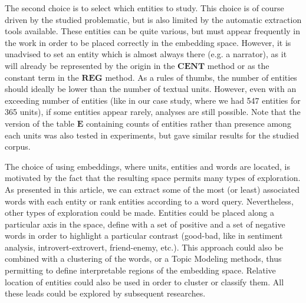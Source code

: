 \documentclass[
twocolumn,
]{ceurart}
\begin{document}
The second choice is to select which entities to study. This choice is of course driven by the studied problematic, but is also limited by the automatic extraction tools available. These entities can be quite various, but must appear frequently in the work in order to be placed correctly in the embedding space. However, it is unadvised to set an entity which is almost always there (e.g. a narrator), as it will already be represented by the origin in the $\mathbf{CENT}$ method or as the constant term in the $\mathbf{REG}$ method. As a rules of thumbs, the number of entities should ideally be lower than the number of textual units. However, even with an exceeding number of entities (like in our case study, where we had 547 entities for 365 units), if some entities appear rarely, analyses are still possible. Note that the version of the table $\mathbf{E}$ containing counts of entities rather than presence among each units was also tested in experiments, but gave similar results for the studied corpus.

The choice of using embeddings, where units, entities and words are located, is motivated by the fact that the resulting space permits many types of exploration. As presented in this article, we can extract some of the most (or least) associated words with each entity or rank entities according to a word query. Nevertheless, other types of exploration could be made. Entities could be placed along a particular axis in the space, define with a set of positive and a set of negative words in order to highlight a particular contrast (good-bad, like in sentiment analysis, introvert-extrovert, friend-enemy, etc.). This approach could also be combined with a clustering of the words, or a Topic Modeling methods, thus permitting to define interpretable regions of the embedding space. Relative location of entities could also be used in order to cluster or classify them. All these leads could be explored by subsequent researches.
\end{document}
